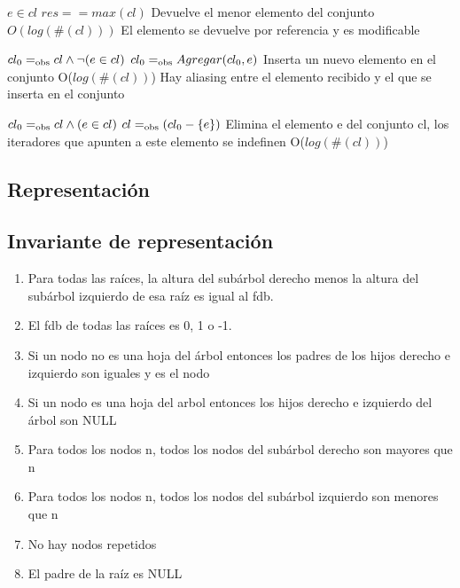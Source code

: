 {$e \in cl$}
{$res == max(cl)$}
{Devuelve el menor elemento del conjunto}
{$O(log(\#(cl)))$}
{El elemento se devuelve por referencia y es modificable}

{$cl_0 =_{\mathrm{obs}} cl \land \neg(e \in cl)$}
{$cl_0 =_{\mathrm{obs}} Agregar(cl_0, e)$}
{Inserta un nuevo elemento en el conjunto}
{O($log(\#(cl))$)}
{Hay aliasing entre el elemento recibido y el que se inserta en el conjunto}

{$cl_0 =_{\mathrm{obs}} cl \land (e \in cl)$}
{$cl =_{\mathrm{obs}} (cl_0 - \{e\})$}
{Elimina el elemento e del conjunto cl, los iteradores que apunten a este elemento se indefinen}
{O($log(\#(cl))$)}
{}

\subsection{Representación}


\newpage
\subsection{Invariante de representación}

\begin{enumerate}
	\item Para todas las raíces, la altura del subárbol derecho menos la altura del subárbol izquierdo de esa raíz es igual al fdb.
	\item El fdb de todas las raíces es 0, 1 o -1.
	\item Si un nodo no es una hoja del árbol entonces los padres de los hijos derecho e izquierdo son iguales y es el nodo
	\item Si un nodo es una hoja del arbol entonces los hijos derecho e izquierdo del árbol son NULL
	\item Para todos los nodos n, todos los nodos del subárbol derecho son mayores que n
	\item Para todos los nodos n, todos los nodos del subárbol izquierdo son menores que n
	\item No hay nodos repetidos
	\item El padre de la raíz es NULL
\end{enumerate}

